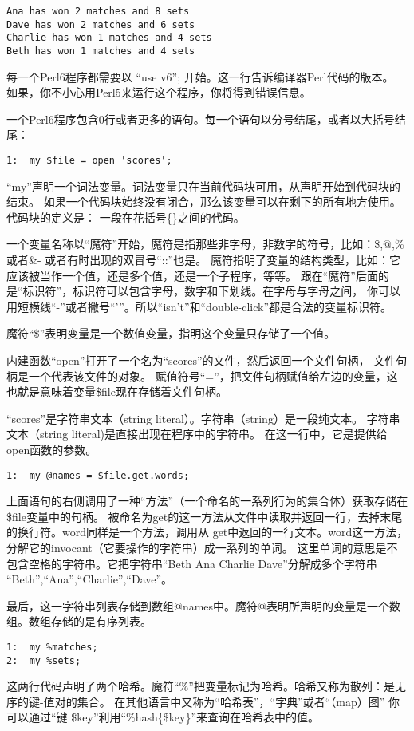 \documentclass[11pt]{article}
\begin{document}
\begin{verbatim}
Ana has won 2 matches and 8 sets
Dave has won 2 matches and 6 sets
Charlie has won 1 matches and 4 sets
Beth has won 1 matches and 4 sets
\end{verbatim}
每一个Perl6程序都需要以 “use v6”; 开始。这一行告诉编译器Perl代码的版本。
如果，你不小心用Perl5来运行这个程序，你将得到错误信息。

一个Perl6程序包含0行或者更多的语句。每一个语句以分号结尾，或者以大括号结尾：

\begin{verbatim}
1:  my $file = open 'scores';
\end{verbatim}
``my''声明一个词法变量。词法变量只在当前代码块可用，从声明开始到代码块的结束。
如果一个代码块始终没有闭合，那么该变量可以在剩下的所有地方使用。代码块的定义是：
一段在花括号\{\}之间的代码。

一个变量名称以“魔符”开始，魔符是指那些非字母，非数字的符号，比如：\$,@,\% 或者\&-
或者有时出现的双冒号“::”也是。
魔符指明了变量的结构类型，比如：它应该被当作一个值，还是多个值，还是一个子程序，等等。
跟在“魔符”后面的是“标识符”，标识符可以包含字母，数字和下划线。在字母与字母之间，
你可以用短横线“-”或者撇号“'”。所以“isn't”和“double-click”都是合法的变量标识符。

魔符“\$”表明变量是一个数值变量，指明这个变量只存储了一个值。

内建函数“open”打开了一个名为“scores”的文件，然后返回一个文件句柄，
文件句柄是一个代表该文件的对象。
赋值符号“=”，把文件句柄赋值给左边的变量，这也就是意味着变量\$file现在存储着文件句柄。

“scores”是字符串文本（string literal）。字符串（string）是一段纯文本。
字符串文本（string literal)是直接出现在程序中的字符串。
在这一行中，它是提供给open函数的参数。


\begin{verbatim}
1:  my @names = $file.get.words;
\end{verbatim}
上面语句的右侧调用了一种“方法”（一个命名的一系列行为的集合体）获取存储在\$file变量中的句柄。
被命名为get的这一方法从文件中读取并返回一行，去掉末尾的换行符。word同样是一个方法，调用从
get中返回的一行文本。word这一方法，分解它的invocant（它要操作的字符串）成一系列的单词。
这里单词的意思是不包含空格的字符串。它把字符串“Beth Ana Charlie Dave”分解成多个字符串
“Beth”,“Ana”,“Charlie”,“Dave”。

最后，这一字符串列表存储到数组@names中。魔符@表明所声明的变量是一个数组。数组存储的是有序列表。


\begin{verbatim}
1:  my %matches;
2:  my %sets;
\end{verbatim}
这两行代码声明了两个哈希。魔符“\%”把变量标记为哈希。哈希又称为散列：是无序的键-值对的集合。
在其他语言中又称为“哈希表”，“字典”或者“（map）图”
你可以通过“键 \$key”利用“\%hash\{\$key\}”来查询在哈希表中的值。
\end{document}
